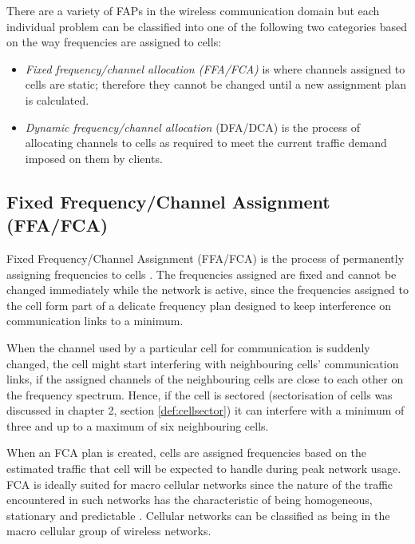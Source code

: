 There are a variety of FAPs in the wireless communication domain but each individual problem can be classified into one of the following two categories based on the way frequencies are assigned to cells:
\begin{itemize}
\item \emph{Fixed frequency/channel allocation (FFA/FCA)} is where channels assigned to cells are static; therefore they cannot be changed until a new assignment plan is calculated\cite{PrinciplesMobileCommunication}.
\item \emph{Dynamic frequency/channel allocation} (DFA/DCA) is the process of allocating channels to cells as required to meet the current traffic demand imposed on them by clients\cite{PrinciplesMobileCommunication}. 
\end{itemize}

\subsection{Fixed Frequency/Channel Assignment (FFA/FCA)}
Fixed Frequency/Channel Assignment (FFA/FCA) is the process of permanently assigning frequencies to cells \cite{PrinciplesMobileCommunication}. The frequencies assigned are fixed and cannot be changed immediately while the network is active, since the frequencies assigned to the cell form part of a delicate frequency plan designed to keep interference on communication links to a minimum\cite{PrinciplesMobileCommunication}. 

When the channel used by a particular cell for communication is suddenly changed, the cell might start interfering with neighbouring cells' communication links, if the assigned channels of the neighbouring cells are close to each other on the frequency spectrum. Hence, if the cell is sectored (sectorisation of cells was discussed in chapter 2, section \ref{def:cellsector}) it can interfere with a minimum of three and up to a maximum of six neighbouring cells\cite{PrinciplesMobileCommunication}.

When an FCA plan is created, cells are assigned frequencies based on the estimated traffic that cell will be expected to handle during peak network usage. FCA is ideally suited for macro cellular networks since the nature of the traffic encountered in such networks has the characteristic of being homogeneous, stationary and predictable \cite{PrinciplesMobileCommunication}. Cellular networks can be classified as being in the macro cellular group of wireless networks.

